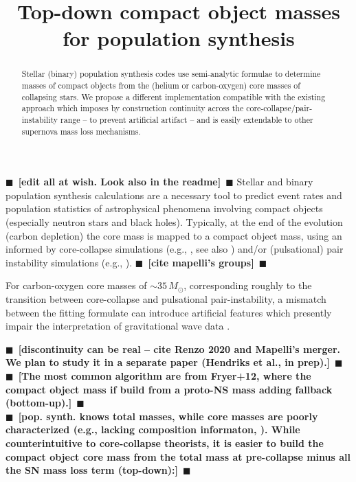 \documentclass[twocolumn]{aastex63}
\newcommand{\todo}[1]{{\large $\blacksquare$~\textbf{\color{red}[#1]}}~$\blacksquare$}
\begin{document}
\title{Top-down compact object masses for population synthesis}


\begin{abstract}
  Stellar (binary) population synthesis codes use semi-analytic
  formulae to determine masses of compact objects from the (helium or
  carbon-oxygen) core masses of collapsing stars. We propose a
  different implementation compatible with the existing approach which
  imposes by construction continuity across the
  core-collapse/pair-instability range -- to prevent artificial
  artifact -- and is easily extendable to other supernova mass loss
  mechanisms.
\end{abstract}

\section*{}
\todo{edit all at wish. Look also in the readme}
Stellar and binary population synthesis calculations are a necessary
tool to predict event rates and population statistics of astrophysical
phenomena involving compact objects (especially neutron stars and
black holes). Typically, at the end of the evolution (carbon
depletion) the core mass is mapped to a compact object mass, using an
informed by core-collapse simulations (e.g., \citealt{fryer:12,
  spera:15, mandel:20, couch:20}, see also \citealt{zapartas:21, patton:21}) and/or (pulsational) pair instability simulations
(e.g., \citealt{belczynski:16, woosley:17, stevenson:19, marchant:19, farmer:19}). \todo{cite
  mapelli's groups}

For carbon-oxygen core masses of $\sim{}35\,M_\odot$, corresponding
roughly to the transition between core-collapse and pulsational
pair-instability, a mismatch between the fitting formulate can
introduce artificial features which presently impair the
interpretation of gravitational wave data \citep[see e.g. the
corresponding feature in Fig.~5 of][]{vanson:21}.

\todo{discontinuity can be real -- cite Renzo 2020 and Mapelli's
  merger. We plan to study it in a separate paper (Hendriks et al., in
  prep).}\\

\todo{The most common algorithm are from Fryer+12, where the compact
  object mass if build from a proto-NS mass adding fallback (bottom-up).}\\
\todo{pop. synth. knows total masses, while core masses are poorly
  characterized (e.g., lacking composition informaton,
  \citealt{patton:20}). While counterintuitive to core-collapse
  theorists, it is easier to build the compact object core mass from
  the total mass at pre-collapse minus all the SN mass loss term
  (top-down):}\\
\end{document}
